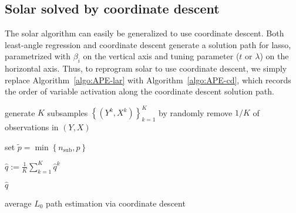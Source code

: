 \documentclass[11pt,authoryear]{elsarticle}
\begin{document}
\subsection{Solar solved by coordinate descent}

The solar algorithm can easily be generalized to use coordinate descent. Both least-angle regression and coordinate descent generate a solution path for lasso, parametrized with $\beta_i$ on the vertical axis and tuning parameter ($t$ or $\lambda$) on the horizontal axis. Thus, to reprogram solar to use coordinate descent, we simply replace Algorithm~\ref{algo:APE-lar} with Algorithm~\ref{algo:APE-cd}, which records the order of variable activation along the coordinate descent solution path.

\smallskip
\begin{algorithm}[h]


  \smallskip

  generate $K$ subsamples $\left\{ \left( Y^k, X^k \right) \right\}^{K}_{k=1}$ by randomly remove $1/K$ of observations in $\left( Y, X \right)$\;

  set $\widetilde{p} = \min\left\{ n_{\mathrm{sub}}, p \right\}$ \;


  $\widehat{q} := \frac{1}{K} \sum_{k=1}^{K} \widehat{q}^k$\; 

  \Return $\widehat{q}$

\caption{average $L_0$ path estimation via coordinate descent \label{algo:APE-cd}}

\end{algorithm}
\end{document}
